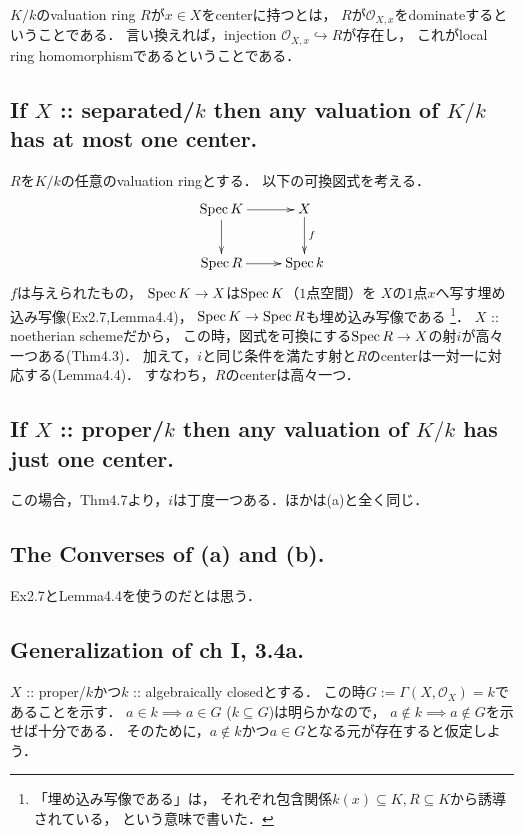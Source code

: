\documentclass[a4paper]{jsarticle}
\newcommand{\shO}{\mathcal{O}}
\begin{document}
    $K/k$のvaluation ring $R$が$x \in X$をcenterに持つとは，
    $R$が$\shO_{X,x}$をdominateするということである．
    言い換えれば，injection $\shO_{X,x} \hookrightarrow R$が存在し，
    これがlocal ring homomorphismであるということである．

    \subsection{If $X$ :: separated/$k$ then any valuation of $K/k$ has at most one center.}
    $R$を$K/k$の任意のvaluation ringとする．
    以下の可換図式を考える．
    \[
    \xymatrix
    {
        \Spec K \ar[d] \ar[r]& X \ar[d]^-{f} \\
        \Spec R \ar[r] & \Spec k
    }
    \]
    $f$は与えられたもの，
    $\operatorname{Spec} K \to X$は$\operatorname{Spec} K$（$1$点空間）を
    $X$の$1$点$x$へ写す埋め込み写像(Ex2.7,Lemma4.4)，
    $\operatorname{Spec} K \to \operatorname{Spec} R$も埋め込み写像である
    \footnote
        {
            「埋め込み写像である」は，
            それぞれ包含関係$k(x) \subseteq K, R \subseteq K$から誘導されている，
            という意味で書いた．
        }．
    $X$ :: noetherian schemeだから，
    この時，図式を可換にする$\operatorname{Spec} R \to X$の射$i$が高々一つある(Thm4.3)．
    加えて，$i$と同じ条件を満たす射と$R$のcenterは一対一に対応する(Lemma4.4)．
    すなわち，$R$のcenterは高々一つ．

    \subsection{If $X$ :: proper/$k$ then any valuation of $K/k$ has just one center.}
    この場合，Thm4.7より，$i$は丁度一つある．ほかは(a)と全く同じ．

    \subsection{The Converses of (a) and (b).}
    Ex2.7とLemma4.4を使うのだとは思う．

    \subsection{Generalization of ch I, 3.4a.}
    $X$ :: proper/$k$かつ$k$ :: algebraically closedとする．
    この時$G:=\Gamma(X, \shO_X)=k$であることを示す．
    $a \in k \implies a \in G$
    ($k \subseteq G$)は明らかなので，
    $a \not \in k \implies a \not \in G$を示せば十分である．
    そのために，$a \not \in k$かつ$a \in G$となる元が存在すると仮定しよう．
\end{document}
